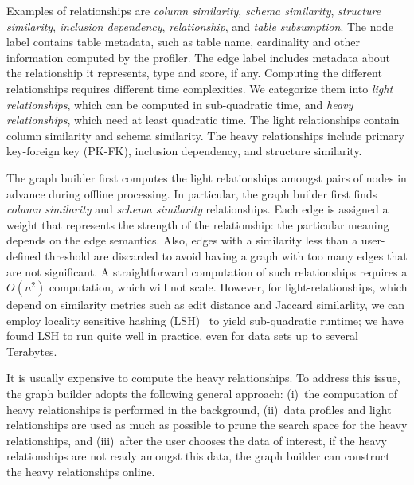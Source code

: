 Examples of relationships are 
\emph{column similarity}, 
\emph{schema similarity}, 
\emph{structure similarity}, %
\emph{inclusion dependency}, 
\emph{\pkfk relationship}, and
\emph{table subsumption}. 
The node label contains table metadata, such as table name, cardinality and
other information computed by the profiler. The edge label includes metadata
about the relationship it represents, \eg type and score, if any. Computing the
different relationships requires different time complexities. We categorize them
into \textit{light relationships}, which can be computed in sub-quadratic time,
and \textit{heavy relationships}, which need at least quadratic time. The light
relationships contain column similarity and schema similarity. The heavy
relationships include primary key-foreign key (PK-FK), inclusion dependency, and structure
similarity. 


The graph builder first computes the light relationships amongst pairs of nodes
in advance during offline processing. In particular, the graph builder first
finds \emph{column similarity} and \emph{schema similarity} relationships.  Each
edge is assigned a weight that represents the strength of the relationship: the
particular meaning depends on the edge semantics. Also, edges with a similarity
less than a user-defined threshold are discarded to avoid having a graph with
too many edges that are not significant.  A straightforward computation of such
relationships requires a $O(n^2)$ computation, which will not scale. However,
for light-relationships, which depend on similarity metrics such as edit
distance and Jaccard similarlity, we can employ locality sensitive hashing
(LSH)~\cite{DBLP:conf/compgeom/DatarIIM04} to yield sub-quadratic runtime; we
have found LSH to run quite well in practice, even for data sets up to several
Terabytes.

It is usually expensive to compute the heavy relationships. To address this
issue, the graph builder adopts the following general approach: (i)~the
computation of heavy relationships is performed in the background, (ii)~data
profiles and light relationships are used as much as possible to prune the
search space for the heavy relationships, and (iii)~after the user chooses the
data of interest, if the heavy relationships are not ready amongst this data,
the graph builder can construct the heavy relationships online.

